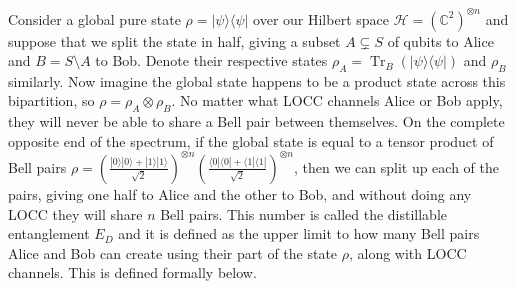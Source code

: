 \documentclass{article}
\DeclareMathOperator{\Tr}{Tr}
\newcommand{\ket}[1]{|#1\rangle}
\newcommand{\bra}[1]{\langle #1|}
\newcommand{\ketbra}[2]{| #1\rangle\! \langle #2|}
\begin{document}
Consider a global pure state $\rho = \ketbra{\psi}{\psi}$ over our Hilbert space $\mathcal{H} = (\mathbb{C}^2)^{\otimes n}$ and suppose that we split the state in half, giving a subset $A \subsetneq S$ of qubits to Alice and $B = S \setminus A$ to Bob. Denote their respective states $\rho_A = \Tr_B ( \ketbra{\psi}{\psi})$ and $\rho_B$ similarly. Now imagine the global state happens to be a product state across this bipartition, so $\rho = \rho_A \otimes \rho_B$. No matter what LOCC channels Alice or Bob apply, they will never be able to share a Bell pair between themselves. On the complete opposite end of the spectrum, if the global state is equal to a tensor product of Bell pairs $\rho = \left(\frac{\ket{0}\ket{0} + \ket{1}\ket{1}}{\sqrt{2}} \right)^{\otimes n} \left(\frac{\bra{0}\bra{0} + \bra{1}\bra{1}}{\sqrt{2}} \right)^{\otimes n}$, then we can split up each of the pairs, giving one half to Alice and the other to Bob, and without doing any LOCC they will share $n$ Bell pairs. This number is called the distillable entanglement $E_D$ and it is defined as the upper limit to how many Bell pairs Alice and Bob can create using their part of the state $\rho$, along with LOCC channels. This is defined formally below. 


\end{document}
